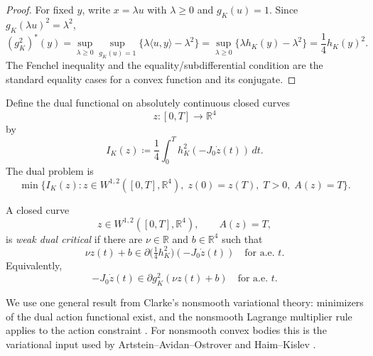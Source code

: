 \begin{proof}
For fixed \(y\), write \(x=\lambda u\) with \(\lambda\geq0\) and
\(g_K(u)=1\). Since \(g_K(\lambda u)^2=\lambda^2\),
\[
  (g_K^2)^*(y)
  = \sup_{\lambda\geq0}
      \sup_{g_K(u)=1}\{\lambda\langle u,y\rangle-\lambda^2\}
  = \sup_{\lambda\geq0}\{\lambda h_K(y)-\lambda^2\}
  = \frac{1}{4}h_K(y)^2.
\]
The Fenchel inequality and the equality/subdifferential condition are the
standard equality cases for a convex function and its conjugate.
\end{proof}

Define the dual functional on absolutely continuous closed curves
\[
  z\colon[0,T]\to\mathbb{R}^4
\]
by
\begin{equation}\label{eq:preliminaries-dual-functional}
  I_K(z) \coloneqq
  \frac{1}{4}\int_0^T h_K^2(-J_0\dot{z}(t))\,dt.
\end{equation}
The dual problem is
\begin{equation}\label{eq:preliminaries-dual-problem}
  \min\{I_K(z):
    z\in W^{1,2}([0,T],\mathbb{R}^4),\;
    z(0)=z(T),\; T>0,\; A(z)=T\}.
\end{equation}

\begin{definition}\label{def:preliminaries-weak-dual-critical}
A closed curve
\[
  z\in W^{1,2}([0,T],\mathbb{R}^4),
  \qquad A(z)=T,
\]
is \emph{weak dual critical} if there are
\(\nu\in\mathbb{R}\) and \(b\in\mathbb{R}^4\) such that
\begin{equation}\label{eq:preliminaries-dual-euler-lagrange}
  \nu z(t)+b
  \in \partial\bigl(\tfrac{1}{4}h_K^2\bigr)(-J_0\dot{z}(t))
  \quad\text{for a.e. }t.
\end{equation}
Equivalently,
\[
  -J_0\dot{z}(t)\in\partial g_K^2(\nu z(t)+b)
  \quad\text{for a.e. }t.
\]
\end{definition}

We use one general result from Clarke's nonsmooth variational theory:
minimizers of the dual action functional exist, and the nonsmooth Lagrange
multiplier rule applies to the action constraint \cite[Ch.~5]{Clarke1983}.
For nonsmooth convex bodies this is the variational input used by
Artstein--Avidan--Ostrover and Haim--Kislev
\cite[Propositions~2.5, 2.7 and Lemmas~5.1, 5.2]{AAO2014}
\cite[Section~2]{HK2017}.

